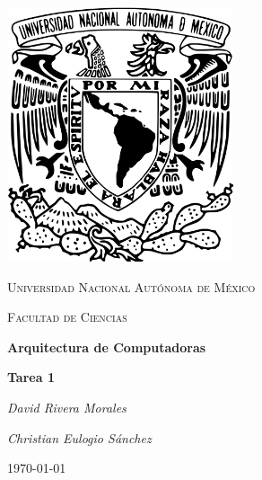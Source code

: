 \begin{titlepage}
    \centering
    \includegraphics[width=0.50\textwidth]{unam_logo.png}\par
    \vspace{1cm}
    {\scshape\Large Universidad Nacional Autónoma de México \par}
    \vspace{1cm}
    {\scshape\Large Facultad de Ciencias \par}
    \vspace{1.5cm}
    {\huge\bfseries Arquitectura de Computadoras \par}
    {\huge\bfseries Tarea 1 \par}
    \vspace{2cm}
    {\Large\itshape David Rivera Morales\par}
    {\Large \itshape Christian Eulogio Sánchez \par}
    \vfill
  
    {\large \today\par}
\end{titlepage}

